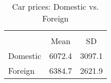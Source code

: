 \begin{table}[htbp]\centering
\def\sym#1{\ifmmode^{#1}\else\(^{#1}\)\fi}
\caption{Car prices: Domestic vs. Foreign \label{replace\_me}}
\begin{tabular}{l*{1}{cc}}
\toprule
                    &\multicolumn{2}{c}{}     \\
                    &        Mean&          SD\\
\midrule
Domestic            &      6072.4&      3097.1\\
\addlinespace
Foreign             &      6384.7&      2621.9\\
\bottomrule
\end{tabular}
\end{table}
